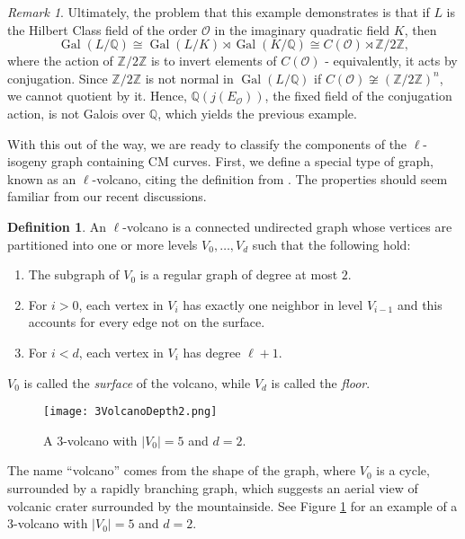 \documentclass{amsart}
\theoremstyle{definition}
\newtheorem{definition}[thm]{Definition}
\theoremstyle{remark}
\newtheorem{remark}[thm]{Remark}
\numberwithin{equation}{section}
\newcommand{\cO}{\mathcal O}
\newcommand{\bbQ}{\mathbb Q}
\newcommand{\bbZ}{\mathbb Z}
\DeclareMathOperator{\Gal}{Gal}
\begin{document}
\begin{remark}
 Ultimately, the problem that this example demonstrates is that if $L$ is the Hilbert Class field of the order $\cO$ in the imaginary quadratic field $K$, then 
 \[
 \Gal(L/\bbQ) \cong \Gal(L/K) \rtimes \Gal(K/\bbQ) \cong C(\cO) \rtimes \bbZ/2\bbZ,
 \]
 where the action of $\bbZ/2\bbZ$ is to invert elements of $C(\cO)$ - equivalently, it acts by conjugation. Since $\bbZ/2\bbZ$ is not normal in $\Gal(L/\bbQ)$ if $C(\cO) \not \cong (\bbZ/2\bbZ)^n$, we cannot quotient by it. Hence, $\bbQ(j(E_{\cO}))$, the fixed field of the conjugation action, is not Galois over $\bbQ$, which yields the previous example.
 \end{remark}
 
 With this out of the way, we are ready to classify the components of the $\ell$-isogeny graph containing CM curves. First, we define a special type of graph, known as an $\ell$-volcano, citing the definition from \cite{SutherlandIV}. The properties should seem familiar from our recent discussions.
 
 \begin{definition}
 An $\ell$-volcano is a connected undirected graph whose vertices are partitioned into one or more levels $V_{0}, \dots, V_{d}$ such that the following hold:
 \begin{enumerate}
 \item The subgraph of $V_{0}$ is a regular graph of degree at most $2$.
 \item For $i > 0$, each vertex in $V_{i}$ has exactly one neighbor in level $V_{i-1}$ and this accounts for every edge not on the surface.
 \item For $i < d$, each vertex in $V_{i}$ has degree $\ell + 1$.
 \end{enumerate}
 $V_{0}$ is called the \emph{surface} of the volcano, while $V_{d}$ is called the \emph{floor}.
 \end{definition}
 
 \begin{figure} \label{fig:3VolcanoExample}
 \centering
 \texttt{[image: 3VolcanoDepth2.png]}  %
  \caption{A $3$-volcano with $|V_{0}| = 5$ and $d = 2$.}
 \end{figure}
 
 The name ``volcano'' comes from the shape of the graph, where $V_{0}$ is a cycle, surrounded by a rapidly branching graph, which suggests an aerial view of volcanic crater surrounded by the mountainside. See Figure \ref{fig:3VolcanoExample} for an example of a 3-volcano with $|V_{0}| = 5$ and $d = 2$.
 
\end{document}
